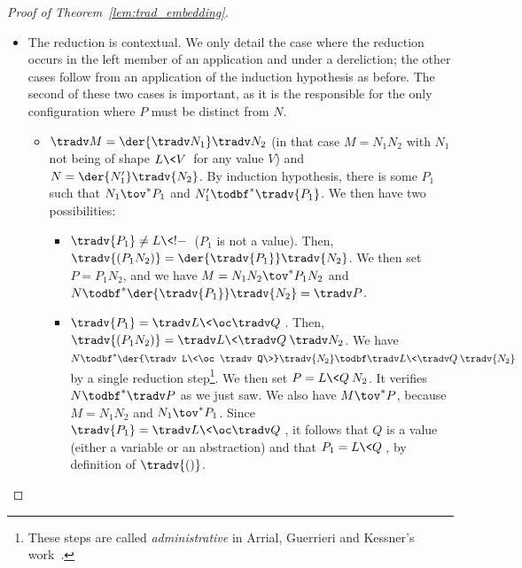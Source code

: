 \begin{proof}[Proof of Theorem~\ref{lem:trad_embedding}]
\begin{itemize}
			$N=\tradv{(L\<N_1\{N_2/x\})}$. We then set
			$P=L\<N_1\{N_2/x\}\>$.
		\item The reduction is contextual. We only detail the case where
			the reduction occurs in the left member of an
			application and under a dereliction; the other
			cases follow from an application
			of the induction hypothesis as before. The second of
			these two cases is
			important, as it is the responsible for the only
			configuration where $P$ must be distinct from $N$.
			\begin{itemize}
				\item $\tradv M=\der{\tradv N_1}\tradv N_2$ (in
					that case $M=N_1N_2$ with $N_1$ not
					being of shape $L\<V\>$ for any value
					$V$) and $N=\der{N_1'}\tradv{N_2}$. By
					induction hypothesis, there is some
					$P_1$ such that $N_1\tov^*P_1$ and
					$N_1'\todbf^*\tradv{P_1}$. We then have two
					possibilities:
					\begin{itemize}
						\item $\tradv{P_1}\neq L\<!-\>$
							($P_1$ is not a value).
							Then,
							$\tradv{(P_1N_2)}=\der{\tradv{P_1}}\tradv{N_2}$.
							We then set $P=P_1N_2$,
							and we have
							$M=N_1N_2\tov^*P_1N_2$
							and
							$N\todbf^*\der{\tradv{P_1}}\tradv{N_2}=\tradv
							P$.
						\item $\tradv{P_1}=\tradv L\<\oc
							\tradv Q\>$. Then,
							$\tradv{(P_1N_2)}=
							\tradv L\<\tradv Q\>\tradv
							N_2$. We have $N\todbf^*\der{\tradv
                                                       L\<\oc\tradv
                                                       Q\>}\tradv{N_2}\todbf\tradv L\<\tradv Q\>\tradv{N_2}$ 
                                                       by a single reduction
                                                       step\footnote{
                                                               These steps are called \emph{administrative}
                                                               in Arrial, Guerrieri and Kessner's
                                                               work~\cite{arrial-diligence}.
                                                       }. We then set $P=L\< Q\>N_2$.
                                                       It verifies $N\todbf^*\tradv P$ as we
                                                       just saw. We also have
							$M\tov^* P$, because
                                                       $M=N_1N_2$ and $N_1\tov^*P_1$.
                                                       Since $\tradv{P_1}=\tradv
                                                       L\<\oc\tradv Q\>$, it follows that
                                                       $Q$ is a value (either a variable
                                                       or an abstraction) and that
                                                       $P_1=L\<Q\>$, by definition of
                                                       $\tradv{()}$. \qedhere
					\end{itemize}


\end{itemize}
\end{itemize}
\end{proof}
